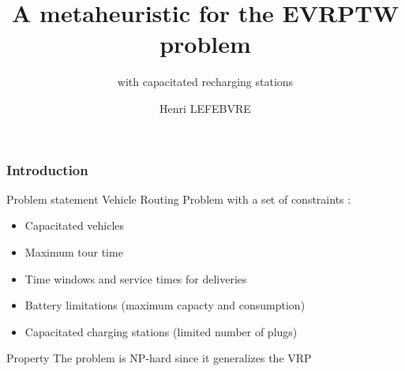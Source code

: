 \documentclass{beamer}
\begin{document}
\title{A metaheuristic for the EVRPTW problem}
\subtitle{with capacitated recharging stations}
\author{Henri LEFEBVRE}

\maketitle

\begin{frame}
    \frametitle{Introduction}

    \begin{block}{Problem statement}
        Vehicle Routing Problem with a set of constraints :
        \begin{itemize}
            \item Capacitated vehicles
            \item Maximum tour time
            \item Time windows and service times for deliveries
            \item Battery limitations (maximum capacty and consumption)
            \item Capacitated charging stations (limited number of plugs)
        \end{itemize}
    \end{block}

    \begin{block}{Property}
        The problem is NP-hard since it generalizes the VRP
    \end{block}

\end{frame}
\end{document}
